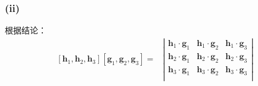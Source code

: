 \documentclass[UTF8,zihao=5]{ctexart}
\newcommand{\bm}[1]{{\mathbf{#1}}}
\begin{document}
\subsubsection*{(ii)}

根据结论：
\begin{equation}
    \begin{aligned}
        [\bm{h}_1,\bm{h}_2,\bm{h}_3][\bm{g}_1,\bm{g}_2,\bm{g}_3]
        = & \left|
        \begin{matrix}
            \bm{h}_1\cdot\bm{g}_1 & \bm{h}_1\cdot\bm{g}_2 & \bm{h}_1\cdot\bm{g}_3 \\
            \bm{h}_2\cdot\bm{g}_1 & \bm{h}_2\cdot\bm{g}_2 & \bm{h}_2\cdot\bm{g}_3 \\
            \bm{h}_3\cdot\bm{g}_1 & \bm{h}_3\cdot\bm{g}_2 & \bm{h}_3\cdot\bm{g}_3 \\
        \end{matrix}
        \right|
    \end{aligned}
\end{equation}
\end{document}
